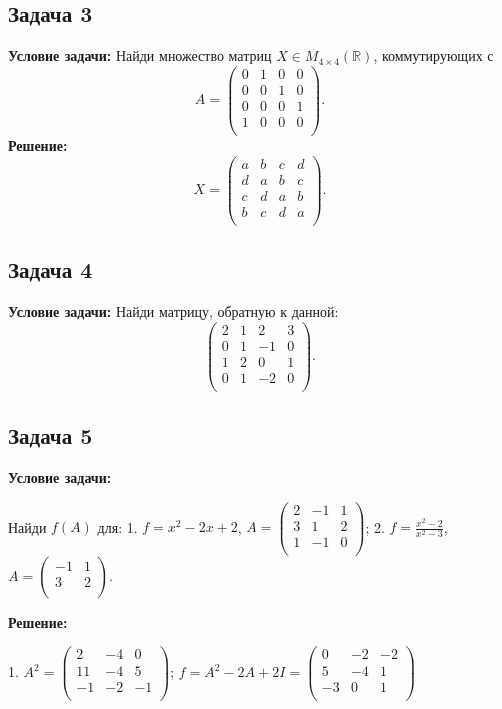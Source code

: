 \documentclass[a4paper,12pt]{article}
\begin{document}
\subsection{Задача 3}
\textbf{Условие задачи:}
Найди множество матриц $X \in M_{4 \times 4}(\mathbb{R})$, коммутирующих с
\[
A =
\begin{pmatrix}
0 & 1 & 0 & 0 \\
0 & 0 & 1 & 0 \\
0 & 0 & 0 & 1 \\
1 & 0 & 0 & 0 \\
\end{pmatrix}.
\]
\textbf{Решение: }
\[
X =
\begin{pmatrix}
a & b & c & d \\
d & a & b & c \\
c & d & a & b \\
b & c & d & a \\
\end{pmatrix}.
\]

\subsection{Задача 4}
\textbf{Условие задачи:}
Найди матрицу, обратную к данной:
\[
\begin{pmatrix}
2 & 1 & 2 & 3 \\
0 & 1 & -1 & 0 \\
1 & 2 & 0 & 1 \\
0 & 1 & -2 & 0 \\
\end{pmatrix}.
\]


\subsection{Задача 5}
\textbf{Условие задачи:}

Найди $f(A)$ для:
1. $f = x^2 - 2x + 2$, $A =
\begin{pmatrix}
2 & -1 & 1 \\
3 & 1 & 2 \\
1 & -1 & 0 \\
\end{pmatrix}$;
2. $f = \frac{x^2 - 2}{x^2 - 3}$, $A =
\begin{pmatrix}
-1 & 1 \\
3 & 2 \\
\end{pmatrix}$.

\textbf{Решение: }

1.
$A^2 =
\begin{pmatrix}
2 & -4 & 0 \\
11 & -4 & 5 \\
-1 & -2 & -1 \\
\end{pmatrix}$;
 $f = A^2 - 2A + 2I=
 \begin{pmatrix}
0 & -2 & -2 \\
5 & -4 & 1 \\
-3 & 0 & 1 \\
\end{pmatrix}
 $
\end{document}
